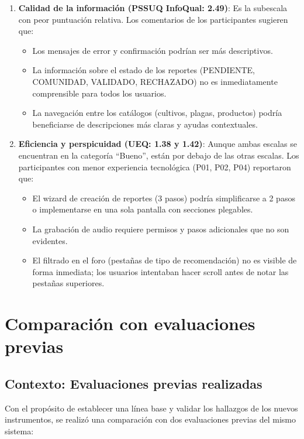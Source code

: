 \documentclass[a4paper,12pt]{report}
\begin{document}
\begin{enumerate}
    \item \textbf{Calidad de la información (PSSUQ InfoQual: 2.49)}: Es la subescala con peor puntuación relativa. Los comentarios de los participantes sugieren que:
    \begin{itemize}
        \item Los mensajes de error y confirmación podrían ser más descriptivos.
        \item La información sobre el estado de los reportes (PENDIENTE, COMUNIDAD, VALIDADO, RECHAZADO) no es inmediatamente comprensible para todos los usuarios.
        \item La navegación entre los catálogos (cultivos, plagas, productos) podría beneficiarse de descripciones más claras y ayudas contextuales.
    \end{itemize}

    \item \textbf{Eficiencia y perspicuidad (UEQ: 1.38 y 1.42)}: Aunque ambas escalas se encuentran en la categoría ``Bueno'', están por debajo de las otras escalas. Los participantes con menor experiencia tecnológica (P01, P02, P04) reportaron que:
    \begin{itemize}
        \item El wizard de creación de reportes (3 pasos) podría simplificarse a 2 pasos o implementarse en una sola pantalla con secciones plegables.
        \item La grabación de audio requiere permisos y pasos adicionales que no son evidentes.
        \item El filtrado en el foro (pestañas de tipo de recomendación) no es visible de forma inmediata; los usuarios intentaban hacer scroll antes de notar las pestañas superiores.
    \end{itemize}
\end{enumerate}

\section{Comparación con evaluaciones previas}

\subsection{Contexto: Evaluaciones previas realizadas}

Con el propósito de establecer una línea base y validar los hallazgos de los nuevos instrumentos, se realizó una comparación con dos evaluaciones previas del mismo sistema:
\end{document}
